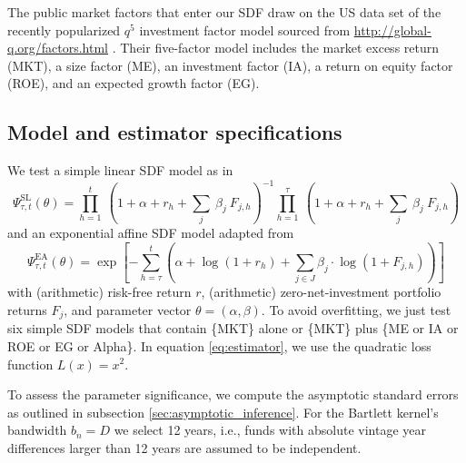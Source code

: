\documentclass[12pt]{article}
\begin{document}
The public market factors that enter our SDF draw on the US data set of the recently popularized $q^5$ investment factor model sourced from \url{http://global-q.org/factors.html} \citep{HXZ15,HXZ20}. 
Their five-factor model includes the market excess return (MKT), a size factor (ME), an investment factor (IA), a return on equity factor (ROE), and an expected growth factor (EG).


\subsection{Model and estimator specifications}
\label{sec:model_selection}
We test a simple linear SDF model as in \cite{DLP12}
\begin{equation}
\label{eq:linear_sdf}
\Psi_{\tau,t}^{\mathrm{SL}} (\theta) = 
\prod_{h=1}^{t}\ \left(1 + \alpha + r_{h} + \sum_j\ \beta_j\ F_{j,h} \right)^{-1}
\prod_{h=1}^{\tau}\ \left(1 + \alpha + r_{h} + \sum_j\ \beta_j \ F_{j,h} \right)
\end{equation}
and an exponential affine SDF model adapted from \cite{KN16}
\begin{equation}
\label{eq:expaff_SDF}
\Psi_{\tau,t}^{\mathrm{EA}} (\theta) = 
\exp
\left[
-
\sum_{h=\tau}^{t} \left( \alpha + \log (1 + r_h) + \sum_{j \in J} \beta_{j} \cdot \log (1 + F_{j,h}) \right)
\right]
\end{equation}
with (arithmetic) risk-free return $r$, (arithmetic) zero-net-investment portfolio returns $F_j$, and parameter vector $\theta=(\alpha,\beta)$.
To avoid overfitting, we just test six simple SDF models that contain \{MKT\} alone or \{MKT\} plus \{ME or IA or ROE or EG or Alpha\}.
In equation \ref{eq:estimator}, we use the quadratic loss function $L(x)=x^2$.

To assess the parameter significance, we compute the asymptotic standard errors as outlined in subsection \ref{sec:asymptotic_inference}.
For the Bartlett kernel's bandwidth $b_n=D$ we select 12 years, i.e., funds with absolute vintage year differences larger than 12 years are assumed to be independent.
\end{document}
